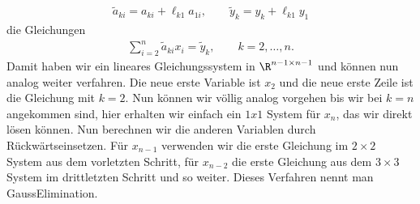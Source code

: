 \documentclass[letterpaper,10pt,english]{jupyterBook}
\begin{document}
\begin{equation*}
\begin{split}\tilde a_{ki} = a_{ki} + \ell_{k1} a_{1i}, \qquad \tilde y_k = y_k + \ell_{k1} y_1\end{split}
\end{equation*}
die Gleichungen
\begin{equation*}
\begin{split} \sum_{i=2}^n \tilde a_{ki} x_i = \tilde y_k, \qquad k=2,\ldots,n.\end{split}
\end{equation*}
Damit haben wir ein lineares Gleichungssystem in \(\R^{n-1 \times n-1}\) und können nun analog weiter verfahren. Die neue erste Variable ist \(x_2\) und die neue erste Zeile ist die Gleichung mit \(k=2\). Nun können wir völlig analog vorgehen bis wir bei \(k=n\) angekommen sind, hier erhalten wir einfach ein \(1x1\) System für \(x_n\), das wir direkt lösen können. Nun berechnen wir die anderen Variablen durch Rückwärtseinsetzen. Für \(x_{n-1}\) verwenden wir die erste Gleichung im \(2 \times 2\) System aus dem vorletzten Schritt, für \(x_{n-2}\) die erste Gleichung aus dem \(3 \times 3\) System im drittletzten Schritt und so weiter.  Dieses Verfahren nennt man Gauss\sphinxhyphen{}Elimination.
\label{vektorraeume/LGS:example-20}
\end{document}
